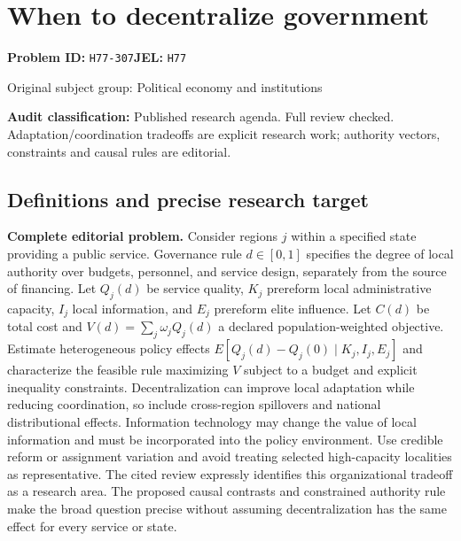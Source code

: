 \documentclass[11pt,a4paper]{article}
\begin{document}
\section*{When to decentralize government}
\textbf{Problem ID:} \texttt{H77-307}\quad \textbf{JEL:} \texttt{H77}\par
\label{problem:OP-0386}
{\sffamily\small\color{muted}Original subject group: Political economy and institutions\par}
\label{definitions:problem:30007668}
\textbf{Audit classification:} Published research agenda. Full review checked. Adaptation/coordination tradeoffs are explicit research work; authority vectors, constraints and causal rules are editorial.
\subsection*{Definitions and precise research target}
\textbf{Complete editorial problem.} Consider regions \(j\) within a specified state providing a public service. Governance rule \(d\in[0,1]\) specifies the degree of local authority over budgets, personnel, and service design, separately from the source of financing. Let \(Q_j(d)\) be service quality, \(K_j\) prereform local administrative capacity, \(I_j\) local information, and \(E_j\) prereform elite influence. Let \(C(d)\) be total cost and \(V(d)=\sum_j\omega_jQ_j(d)\) a declared population-weighted objective. Estimate heterogeneous policy effects \(E[Q_j(d)-Q_j(0)\mid K_j,I_j,E_j]\) and characterize the feasible rule maximizing \(V\) subject to a budget and explicit inequality constraints. Decentralization can improve local adaptation while reducing coordination, so include cross-region spillovers and national distributional effects. Information technology may change the value of local information and must be incorporated into the policy environment. Use credible reform or assignment variation and avoid treating selected high-capacity localities as representative. The cited review expressly identifies this organizational tradeoff as a research area. The proposed causal contrasts and constrained authority rule make the broad question precise without assuming decentralization has the same effect for every service or state.
\end{document}
